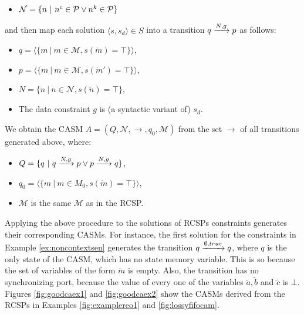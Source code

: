 \begin{itemize} 
  \item $\mathcal{N} = \{n~|~ n^c \in \mathcal{P} \vee n^k \in \mathcal{P} \}$
\end{itemize} 

and then map each solution $\langle s, s_d \rangle \in S$ into a transition $q\xrightarrow{N, g}p$ as follows: %
\begin{itemize}
\item $q = \langle\{m ~|~ m \in \mathcal{M}, s\left(\mathring{m}\right) = \top \}\rangle$,
\item $p = \langle\{m ~|~ m \in \mathcal{M}, s\left(\mathring{m}'\right) = \top \}\rangle$,
\item $N =  \{ n ~|~ n \in \mathcal{N}, s\left(\tilde{n}\right) = \top \}$,%
\item The data constraint $g$ is (a syntactic variant of) $s_d$. 
\end{itemize} 

We obtain the CASM $A=\left( Q, \mathcal{N}, \rightarrow, q_0, \mathcal{M} \right)$ from the set $\longrightarrow$ of all transitions generated above, where: %
 \begin{itemize}
\item $Q = \{q ~|~ q\xrightarrow{N, g}p \vee p\xrightarrow{N, g}q \}$, 
\item $q_0 = \langle\{m~|~ m \in M_0, s(\mathring{m}) = \top \}\rangle$, 
\item $\mathcal{M}$ is the same $\mathcal{M}$ as in the RCSP.
 \end{itemize}

Applying the above procedure to the solutions of RCSPs constraints generates their corresponding CASMs. For instance, the first solution for the constraints in Example \ref{ex:noncontextsen} generates the transition $q\xrightarrow{\emptyset, true}q$, where $q$ is the only state of the CASM, which has no state memory variable. This is so because the set of variables of the form $\mathring{m}$ is empty. Also, the transition has no synchronizing port, because the value of every one of the variables $\tilde{a}, \tilde{b}$ and $\tilde{c}$ is $\bot$. Figures \ref{fig:goodcaex1} and \ref{fig:goodcaex2} show the CASMs derived from the RCSPs in Examples \ref{fig:examplereo1} and \ref{fig:lossyfifocam}.

